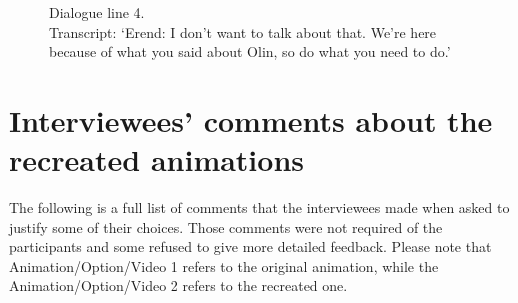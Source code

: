 \begin{figure}[h]
	\centerline{}
	\centerline{}
	\caption{Dialogue line 4. \\ Transcript: `Erend: I don't want to talk about that. We're here because of what you said about Olin, so do what you need to do.'}\label{fig:screenshotlast}
\end{figure}


\section{Interviewees' comments about the recreated animations \label{sec:qcomments}}
The following is a full list of comments that the interviewees made when asked to justify some of their choices. Those comments were not required of the participants and some refused to give more detailed feedback. Please note that Animation/Option/Video 1 refers to the original animation, while the Animation/Option/Video 2 refers to the recreated one.

